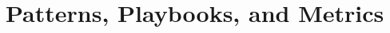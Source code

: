 \documentclass[11pt,oneside]{book}
\begin{document}

\part{Patterns, Playbooks, and Metrics}
\label{part:patterns-playbooks-metrics}

\label{ch:frfp-patterns}





\label{ch:frfp-domain-playbooks}



\label{ch:frfp-metrics}





\label{ch:frfp-open-problems}
\end{document}
